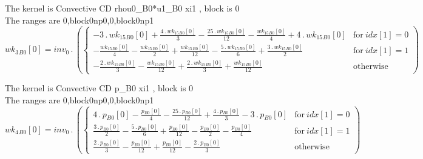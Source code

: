 \documentclass{article}
\begin{document}
\noindent The kernel is Convective CD rhou0_B0*u1_B0 xi1 , block is 0\\\noindent The ranges are 0,block0np0,0,block0np1\\\begin{dmath}{wk_{3}{_{B0}}}[{0}] = inv_0 \,.\, \left(\begin{cases} - 3 \,.\, {wk_{15}{_{B0}}}[{0}] + \frac{4 \,.\, {wk_{15}{_{B0}}}[{0}]}{3} - \frac{25 \,.\, {wk_{15}{_{B0}}}[{0}]}{12} - \frac{{wk_{15}{_{B0}}}[{0}]}{4} + 4 \,.\, 
{wk_{15}{_{B0}}}[{0}] & \text{for}\: {idx}[{1}] = 0 \\- \frac{{wk_{15}{_{B0}}}[{0}]}{4} - \frac{{wk_{15}{_{B0}}}[{0}]}{2} + \frac{{wk_{15}{_{B0}}}[{0}]}{12} - \frac{5 \,.\, {wk_{15}{_{B0}}}[{0}]}{6} + \frac{3 \,.\, {wk_{15}{_{B0}}}[{0}]}{2} & 
\text{for}\: {idx}[{1}] = 1 \\- \frac{2 \,.\, {wk_{15}{_{B0}}}[{0}]}{3} - \frac{{wk_{15}{_{B0}}}[{0}]}{12} + \frac{2 \,.\, {wk_{15}{_{B0}}}[{0}]}{3} + \frac{{wk_{15}{_{B0}}}[{0}]}{12} & \text{otherwise} \end{cases}\right)\end{dmath}

\noindent The kernel is Convective CD p_B0 xi1 , block is 0\\\noindent The ranges are 0,block0np0,0,block0np1\\\begin{dmath}{wk_{4}{_{B0}}}[{0}] = inv_0 \,.\, \left(\begin{cases} 4 \,.\, {p{_{B0}}}[{0}] - \frac{{p{_{B0}}}[{0}]}{4} - \frac{25 \,.\, {p{_{B0}}}[{0}]}{12} + \frac{4 \,.\, {p{_{B0}}}[{0}]}{3} - 3 \,.\, {p{_{B0}}}[{0}] & \text{for}\: {idx}[{1}] = 0 
\\\frac{3 \,.\, {p{_{B0}}}[{0}]}{2} - \frac{5 \,.\, {p{_{B0}}}[{0}]}{6} + \frac{{p{_{B0}}}[{0}]}{12} - \frac{{p{_{B0}}}[{0}]}{2} - \frac{{p{_{B0}}}[{0}]}{4} & \text{for}\: {idx}[{1}] = 1 \\\frac{2 \,.\, {p{_{B0}}}[{0}]}{3} - 
\frac{{p{_{B0}}}[{0}]}{12} + \frac{{p{_{B0}}}[{0}]}{12} - \frac{2 \,.\, {p{_{B0}}}[{0}]}{3} & \text{otherwise} \end{cases}\right)\end{dmath}
\end{document}
